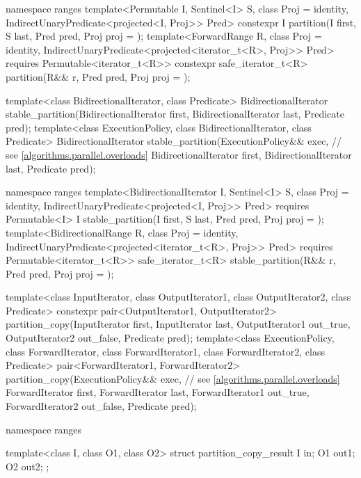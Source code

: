 \begin{codeblock}
{  namespace ranges {
    template<Permutable I, Sentinel<I> S, class Proj = identity,
             IndirectUnaryPredicate<projected<I, Proj>> Pred>
      constexpr I
        partition(I first, S last, Pred pred, Proj proj = {});
    template<ForwardRange R, class Proj = identity,
             IndirectUnaryPredicate<projected<iterator_t<R>, Proj>> Pred>
      requires Permutable<iterator_t<R>>
      constexpr safe_iterator_t<R>
        partition(R&& r, Pred pred, Proj proj = {});
  }

  template<class BidirectionalIterator, class Predicate>
    BidirectionalIterator stable_partition(BidirectionalIterator first,
                                           BidirectionalIterator last,
                                           Predicate pred);
  template<class ExecutionPolicy, class BidirectionalIterator, class Predicate>
    BidirectionalIterator stable_partition(ExecutionPolicy&& exec, // see \ref{algorithms.parallel.overloads}
                                           BidirectionalIterator first,
                                           BidirectionalIterator last,
                                           Predicate pred);

  namespace ranges {
    template<BidirectionalIterator I, Sentinel<I> S, class Proj = identity,
             IndirectUnaryPredicate<projected<I, Proj>> Pred>
      requires Permutable<I>
      I stable_partition(I first, S last, Pred pred, Proj proj = {});
    template<BidirectionalRange R, class Proj = identity,
             IndirectUnaryPredicate<projected<iterator_t<R>, Proj>> Pred>
      requires Permutable<iterator_t<R>>
      safe_iterator_t<R> stable_partition(R&& r, Pred pred, Proj proj = {});
  }

  template<class InputIterator, class OutputIterator1,
           class OutputIterator2, class Predicate>
    constexpr pair<OutputIterator1, OutputIterator2>
      partition_copy(InputIterator first, InputIterator last,
                     OutputIterator1 out_true, OutputIterator2 out_false,
                     Predicate pred);
  template<class ExecutionPolicy, class ForwardIterator, class ForwardIterator1,
           class ForwardIterator2, class Predicate>
    pair<ForwardIterator1, ForwardIterator2>
      partition_copy(ExecutionPolicy&& exec, // see \ref{algorithms.parallel.overloads}
                     ForwardIterator first, ForwardIterator last,
                     ForwardIterator1 out_true, ForwardIterator2 out_false,
                     Predicate pred);

  namespace ranges {
    template<class I, class O1, class O2>
    struct partition_copy_result {
      I  in;
      O1 out1;
      O2 out2;
    };

}}
\end{codeblock}
